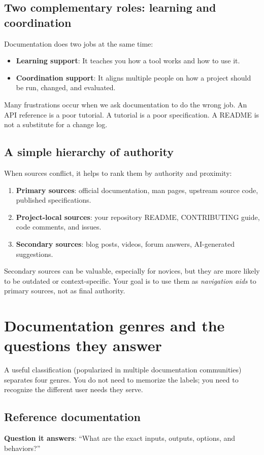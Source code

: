\subsection{Two complementary roles: learning and coordination}
Documentation does two jobs at the same time:
\begin{itemize}[noitemsep]
  \item \textbf{Learning support}: It teaches you how a tool works and how to use it.
  \item \textbf{Coordination support}: It aligns multiple people on how a project should be run, changed, and evaluated.
\end{itemize}

Many frustrations occur when we ask documentation to do the wrong job. An API reference is a poor tutorial. A tutorial is a poor specification. A README is not a substitute for a change log.

\subsection{A simple hierarchy of authority}
When sources conflict, it helps to rank them by authority and proximity:
\begin{enumerate}[noitemsep]
  \item \textbf{Primary sources}: official documentation, man pages, upstream source code, published specifications.
  \item \textbf{Project-local sources}: your repository README, CONTRIBUTING guide, code comments, and issues.
  \item \textbf{Secondary sources}: blog posts, videos, forum answers, AI-generated suggestions.
\end{enumerate}

Secondary sources can be valuable, especially for novices, but they are more likely to be outdated or context-specific. Your goal is to use them as \emph{navigation aids} to primary sources, not as final authority.

\section{Documentation genres and the questions they answer}
A useful classification (popularized in multiple documentation communities) separates four genres. You do not need to memorize the labels; you need to recognize the different user needs they serve.

\subsection{Reference documentation}
\textbf{Question it answers}: “What are the exact inputs, outputs, options, and behaviors?”

